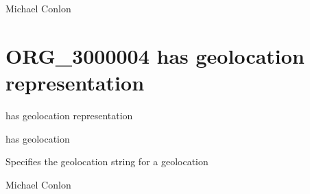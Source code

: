 \documentclass[letterpaper,10pt,english]{sphinxmanual}
\begin{document}
\begin{sphinxShadowBox}

\sphinxAtStartPar
Michael Conlon 
\end{sphinxShadowBox}
\begin{quote}

\ignorespaces \end{quote}


\section{ORG\_3000004 \sphinxhyphen{} has geolocation representation}
\label{\detokenize{doc-ORG_3000004:org-3000004-has-geolocation-representation}}\label{\detokenize{doc-ORG_3000004:index-0}}\label{\detokenize{doc-ORG_3000004::doc}}
\begin{sphinxShadowBox}

\sphinxAtStartPar
has geolocation representation
\end{sphinxShadowBox}

\begin{sphinxShadowBox}

\sphinxAtStartPar
has geolocation
\end{sphinxShadowBox}

\begin{sphinxShadowBox}

\sphinxAtStartPar
{\hyperref[\detokenize{doc-OBI_0002815::doc}]{}}
\end{sphinxShadowBox}

\begin{sphinxShadowBox}

\sphinxAtStartPar
Specifies the geolocation string for a geolocation
\end{sphinxShadowBox}

\begin{sphinxShadowBox}

\sphinxAtStartPar
Michael Conlon 
\end{sphinxShadowBox}
\end{document}

